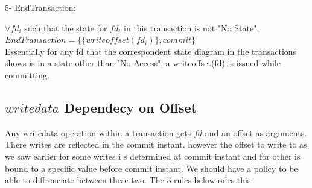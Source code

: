\documentclass[a4paper, 11pt]{article}
\begin{document}


5- EndTransaction: 

\hspace{8mm} $\forall fd_i$ such that the state for $fd_i$ in this transaction is  not "No State",  $EndTransaction= \{\{{writeoffset(fd_i)}\}, commit\}$\\

Essentially for any fd that the correspondent state diagram in the transactions shows is in a state other than "No Access", a writeoffset(fd) is issued while committing.\\



\subsection{$writedata$ Dependecy on Offset}

Any writedata operation within a transaction gets $fd$ and an offset as arguments. There writes are reflected in the commit instant, however the offset to write to as we saw earlier for some writes i s determined at commit instant and for other is bound to a specific value before commit instant. We should have a policy to be able to diffrenciate between these two. The 3 rules below odes this.\\
\end{document}
